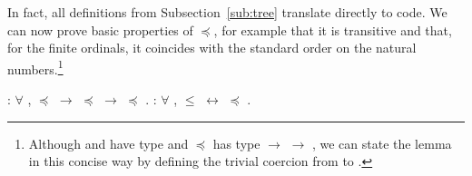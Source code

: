 In fact, all definitions from Subsection~\ref{sub:tree} translate directly to
\Coq code. We can now prove basic properties of $\preceq$, for example
that it is transitive and that, for the finite ordinals, it coincides
with the standard order on the natural numbers.\footnote{Although
   and  have type
  and $\preceq$ has type 
  $\rightarrow$ 
  $\rightarrow$ , we can state the lemma in this
  concise way by defining the trivial coercion from
  to .}
\begin{singlespace}
\begin{coqdoccode}
\coqdocnoindent
{}
:
\ensuremath{\forall} \coqdocvar{\ensuremath{\alpha}}
\coqdocvar{\ensuremath{\beta}}
\coqdocvar{\ensuremath{\gamma}}, \coqdocvariable{\ensuremath{\alpha}}
\ensuremath{\preceq} \coqdocvariable{\ensuremath{\beta}}
\ensuremath{\rightarrow}
\coqdocvariable{\ensuremath{\beta}} \ensuremath{\preceq}
\coqdocvariable{\ensuremath{\gamma}}
\ensuremath{\rightarrow} \coqdocvariable{\ensuremath{\alpha}}
\ensuremath{\preceq}
\coqdocvariable{\ensuremath{\gamma}}.\coqdoceol
\coqdocemptyline
\coqdocnoindent
{}
 :
\ensuremath{\forall}  , 
\ensuremath{\le}  \ensuremath{\leftrightarrow}
 \ensuremath{\preceq} .\coqdoceol
\end{coqdoccode}
\end{singlespace}

